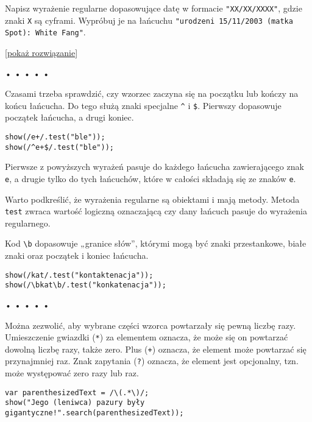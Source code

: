     
Napisz wyrażenie regularne dopasowujące datę w formacie \texttt{"XX/XX/XXXX"}, gdzie znaki \texttt{X} są cyframi. Wypróbuj je na łańcuchu \texttt{"urodzeni 15/11/2003 (matka Spot): White Fang"}.

  
[\hyperref[sol:10.1]{pokaż rozwiązanie}]
  


\begin{center}
• • • • •
\end{center}

  
Czasami trzeba sprawdzić, czy wzorzec zaczyna się na początku lub kończy na końcu łańcucha. Do tego służą znaki specjalne \texttt{\^} i \texttt{\$}. Pierwszy dopasowuje początek łańcucha, a drugi koniec.

  
\begin{verbatim} 
show(/e+/.test("ble"));
show(/^e+$/.test("ble"));
 \end{verbatim}
  
Pierwsze z powyższych wyrażeń pasuje do każdego łańcucha zawierającego znak \texttt{e}, a drugie tylko do tych łańcuchów, które w całości składają się ze znaków \texttt{e}.

  
Warto podkreślić, że wyrażenia regularne są obiektami i mają metody. Metoda \texttt{test} zwraca wartość logiczną oznaczającą czy dany łańcuch pasuje do wyrażenia regularnego.

  
Kod \texttt{\textbackslash b} dopasowuje „granice słów”, którymi mogą być znaki przestankowe, białe znaki oraz początek i koniec łańcucha.

  
\begin{verbatim} 
show(/kat/.test("kontaktenacja"));
show(/\bkat\b/.test("konkatenacja"));
 \end{verbatim}


\begin{center}
• • • • •
\end{center}

  
Można zezwolić, aby wybrane części wzorca powtarzały się pewną liczbę razy. Umieszczenie gwiazdki (\texttt{*}) za elementem oznacza, że może się on powtarzać dowolną liczbę razy, także zero. Plus (\texttt{+}) oznacza, że element może powtarzać się przynajmniej raz. Znak zapytania (\texttt{?}) oznacza, że element jest opcjonalny, tzn. może występować zero razy lub raz.

  
\begin{verbatim} 
var parenthesizedText = /\(.*\)/;
show("Jego (leniwca) pazury były gigantyczne!".search(parenthesizedText));
 \end{verbatim}
  
